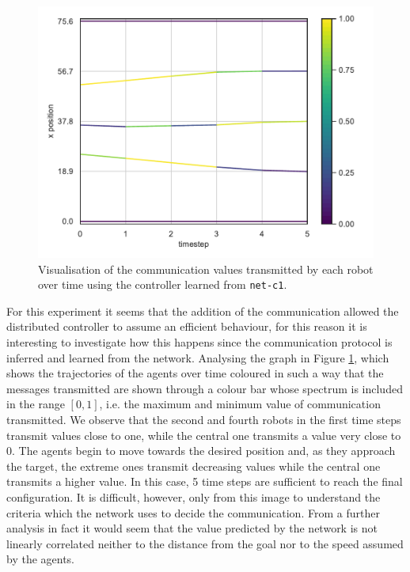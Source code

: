 \begin{figure}[!htb]
	\centering
	\includegraphics[width=.65\textwidth]{contents/images/net-c1/0/plot-simulation-communication-0}
	\vspace{-0.5cm}
	\caption[Evaluation of the communication learned by 
	\texttt{net-c1}.]{Visualisation of the communication values transmitted by each 
		robot over time using the controller learned from \texttt{net-c1}.}	
	\label{fig:net-c1comm}
\end{figure}
For this experiment it seems that the addition of the communication allowed the 
distributed controller to assume an efficient behaviour, for this reason it is 
interesting to investigate how this happens since the communication protocol is 
inferred and learned from the network.
Analysing the graph in Figure \ref{fig:net-c1comm}, which shows the trajectories 
of the agents over time coloured in such a way that the messages transmitted are 
shown through a colour bar whose spectrum is included in the range $[0, 1]$, i.e. 
the maximum and minimum value of communication transmitted. 
We observe that the second and fourth robots in the first time steps transmit 
values close to one, while the central one transmits a value very close to 0. 
The agents begin to move towards the desired position and, as they approach the 
target, the extreme ones transmit decreasing values while the central one 
transmits a higher value. In this case, 5 time steps are sufficient to reach the final 
configuration.
It is difficult, however, only from this image to understand the criteria which the 
network uses to decide the communication.
From a further analysis in fact it would seem that the value predicted by the 
network is not linearly correlated neither to the distance from the goal nor to the 
speed assumed by the agents.

